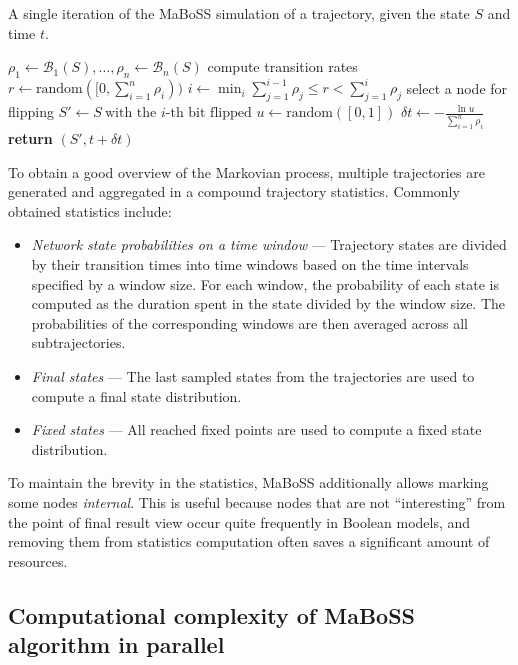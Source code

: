 \documentclass[a4paper,num-refs]{oup-contemporary}
\begin{document}
\begin{algorithm}
\caption{A single iteration of the MaBoSS simulation of a trajectory, given the state $S$ and time $t$.}
\label{alg:iter}
\begin{algorithmic}[1]
\State $\rho_1 \gets \mathcal{B}_1(S), \dots, \rho_n \gets \mathcal{B}_n(S)$ \Comment compute transition rates
\State $r \gets \text{random}([0, \sum_{i=1}^n \rho_i))$
\State $i \gets \min_i \sum_{j=1}^{i-1} \rho_j \leq r < \sum_{j=1}^{i} \rho_j$ \Comment select a node for flipping
\State $S'\gets S\ \text{with the $i$-th bit flipped}$
\State $u \gets \text{random}([0, 1])$
\State $\delta t \gets -\frac{\ln u}{\sum_{i=1}^n \rho_i}$
\State \textbf{return} $(S', t + \delta t)$
\EndProcedure
\end{algorithmic}
\end{algorithm}

To obtain a good overview of the Markovian process, multiple trajectories are generated and aggregated in a compound trajectory statistics. Commonly obtained statistics include:
\begin{itemize}
    \item \emph{Network state probabilities on a time window} --- Trajectory states are divided by their transition times into time windows based on the time intervals specified by a window size. For each window, the probability of each state is computed as the duration spent in the state divided by the window size. The probabilities of the corresponding windows are then averaged across all subtrajectories.
    \item \emph{Final states} --- The last sampled states from the trajectories are used to compute a final state distribution.
    \item \emph{Fixed states} --- All reached fixed points are used to compute a fixed state distribution.
\end{itemize}

To maintain the brevity in the statistics, MaBoSS additionally allows marking some nodes \emph{internal}.
This is useful because nodes that are not ``interesting'' from the point of final result view occur quite frequently in Boolean models, and removing them from statistics computation often saves a significant amount of resources.

\subsection{Computational complexity of MaBoSS algorithm in parallel}
\end{document}
